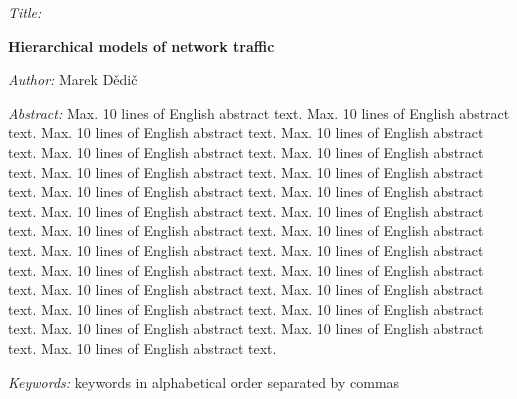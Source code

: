 \begin{english}
	\begin{onehalfspace}
		\noindent \textit{Title:}

		\noindent \textbf{Hierarchical models of network traffic}
	\end{onehalfspace}

	\bigskip

	\noindent \textit{Author:} Marek Dědič

	\bigskip

	\noindent \textit{Abstract:} Max. 10 lines of English abstract text. Max. 10 lines of English abstract text. Max. 10 lines of English abstract text. Max. 10 lines of English abstract text. Max. 10 lines of English abstract text. Max. 10 lines of English abstract text. Max. 10 lines of English abstract text. Max. 10 lines of English abstract text. Max. 10 lines of English abstract text. Max. 10 lines of English abstract text. Max. 10 lines of English abstract text. Max. 10 lines of English abstract text. Max. 10 lines of English abstract text. Max. 10 lines of English abstract text. Max. 10 lines of English abstract text. Max. 10 lines of English abstract text. Max. 10 lines of English abstract text. Max. 10 lines of English abstract text. Max. 10 lines of English abstract text. Max. 10 lines of English abstract text. Max. 10 lines of English abstract text. Max. 10 lines of English abstract text. Max. 10 lines of English abstract text. Max. 10 lines of English abstract text. Max. 10 lines of English abstract text.

	\bigskip

	\noindent \textit{Keywords:} keywords in alphabetical order separated
	by commas

\end{english}

